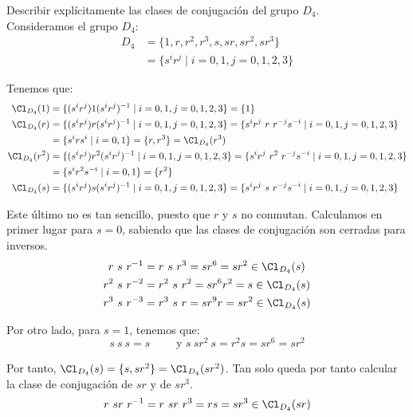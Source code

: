 \begin{ejercicio}\label{ej:6.6}
    Describir explícitamente las clases de conjugación del grupo $D_4$.\\

    Consideramos el grupo $D_4$:
    \begin{align*}
        D_4 &= \{1, r, r^2, r^3, s, sr, sr^2, sr^3\} \\
        &= \{s^ir^j \mid i = 0, 1, j = 0, 1, 2, 3\}
    \end{align*}

    Tenemos que:
    \begin{align*}
        \Cl_{D_4}(1) &= \{(s^i r^j)1(s^i r^j)^{-1} \mid i = 0, 1, j = 0, 1, 2, 3\} = \{1\} \\
        \Cl_{D_4}(r) &= \{(s^i r^j)r(s^i r^j)^{-1} \mid i = 0, 1, j = 0, 1, 2, 3\} = \{s^ir^j\ r\ r^{-j}s^{-i} \mid i = 0, 1, j = 0, 1, 2, 3\} \\
        &= \{s^i r s^i \mid i = 0, 1\} = \{r, r^3\} = \Cl_{D_4}(r^3) \\
        \Cl_{D_4}(r^2) &= \{(s^i r^j)r^2(s^i r^j)^{-1} \mid i = 0, 1, j = 0, 1, 2, 3\} = \{s^i r^j\ r^2\ r^{-j}s^{-i} \mid i = 0, 1, j = 0, 1, 2, 3\} \\
        &= \{s^i r^2 s^{-i} \mid i = 0, 1\} = \{r^2\}\\
        \Cl_{D_4}(s) &= \{(s^i r^j)s(s^i r^j)^{-1} \mid i = 0, 1, j = 0, 1, 2, 3\}
        = \{s^ir^j\ s\ r^{-j}s^{-i} \mid i = 0, 1, j = 0, 1, 2, 3\} 
    \end{align*}

    Este último no es tan sencillo, puesto que $r$ y $s$ no conmutan. Calculamos en primer lugar para $s=0$, sabiendo que las clases de conjugación son cerradas para inversos.
    \begin{align*}
        r\ s\ r^{-1} &= r\ s\ r^3 = sr^6 = sr^2 \in \Cl_{D_4}(s) \\
        r^2\ s\ r^{-2} &= r^2\ s\ r^2 = sr^6r^2=s\in \Cl_{D_4}(s) \\
        r^3\ s\ r^{-3} &= r^3\ s\ r = sr^9r = sr^2 \in \Cl_{D_4}(s)
    \end{align*}

    Por otro lado, para $s=1$, tenemos que:
    \begin{equation*}
        s\ s\ s = s\qquad \text{ y } s\ sr^2\ s = r^2s = sr^6 = sr^2
    \end{equation*}

    Por tanto, $\Cl_{D_4}(s) = \{s, sr^2\} = \Cl_{D_4}(sr^2)$. Tan solo queda por tanto calcular la clase de conjugación de $sr$ y de $sr^3$.
    \begin{equation*}
        r\ sr\ r^{-1} = r\ sr\ r^3 = rs = sr^3 \in \Cl_{D_4}(sr)
    \end{equation*}


\end{ejercicio}

